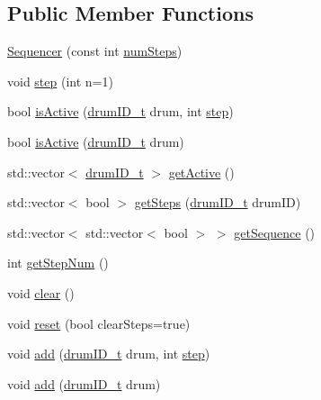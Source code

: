 \subsection*{Public Member Functions}
\begin{DoxyCompactItemize}
\item 
\hyperlink{classdrumpi_1_1Sequencer_ae1c19c8eadf10ac7ef53fa9b8b9d36e9}{Sequencer} (const int \hyperlink{classdrumpi_1_1Sequencer_a0e4963cb16a4c6cbeb85838199c1bb8e}{num\+Steps})
\item 
void \hyperlink{classdrumpi_1_1Sequencer_a86e0af4260c526be4646ce343830e6c4}{step} (int n=1)
\item 
bool \hyperlink{classdrumpi_1_1Sequencer_a9125b926864c998496a662b1fd8cd535}{is\+Active} (\hyperlink{namespacedrumpi_a3897274035c1b939a604438abe648b1b}{drum\+I\+D\+\_\+t} drum, int \hyperlink{classdrumpi_1_1Sequencer_a86e0af4260c526be4646ce343830e6c4}{step})
\item 
bool \hyperlink{classdrumpi_1_1Sequencer_a7af390c7241b0fc7ccdf17cd6f14171f}{is\+Active} (\hyperlink{namespacedrumpi_a3897274035c1b939a604438abe648b1b}{drum\+I\+D\+\_\+t} drum)
\item 
std\+::vector$<$ \hyperlink{namespacedrumpi_a3897274035c1b939a604438abe648b1b}{drum\+I\+D\+\_\+t} $>$ \hyperlink{classdrumpi_1_1Sequencer_a3a4981971243ac03ace9b57fc0a6c8c6}{get\+Active} ()
\item 
std\+::vector$<$ bool $>$ \hyperlink{classdrumpi_1_1Sequencer_a5cc5ed8f6fd51b88618766a16373b60d}{get\+Steps} (\hyperlink{namespacedrumpi_a3897274035c1b939a604438abe648b1b}{drum\+I\+D\+\_\+t} drum\+ID)
\item 
std\+::vector$<$ std\+::vector$<$ bool $>$ $>$ \hyperlink{classdrumpi_1_1Sequencer_aa15ac653eaddea48cb4ccb8dadac9735}{get\+Sequence} ()
\item 
int \hyperlink{classdrumpi_1_1Sequencer_af327472b3452fa67511029daaee4ad1c}{get\+Step\+Num} ()
\item 
void \hyperlink{classdrumpi_1_1Sequencer_a8b7b4faa1438aedb59370bb5ef44f571}{clear} ()
\item 
void \hyperlink{classdrumpi_1_1Sequencer_a033983bb65fa38a3e0f8732040a63eb1}{reset} (bool clear\+Steps=true)
\item 
void \hyperlink{classdrumpi_1_1Sequencer_abf7916305c8766c01b3dc0230012cf3d}{add} (\hyperlink{namespacedrumpi_a3897274035c1b939a604438abe648b1b}{drum\+I\+D\+\_\+t} drum, int \hyperlink{classdrumpi_1_1Sequencer_a86e0af4260c526be4646ce343830e6c4}{step})
\item 
void \hyperlink{classdrumpi_1_1Sequencer_a65d14581132cc9ece12eca56a1696e27}{add} (\hyperlink{namespacedrumpi_a3897274035c1b939a604438abe648b1b}{drum\+I\+D\+\_\+t} drum)

\end{DoxyCompactItemize}
